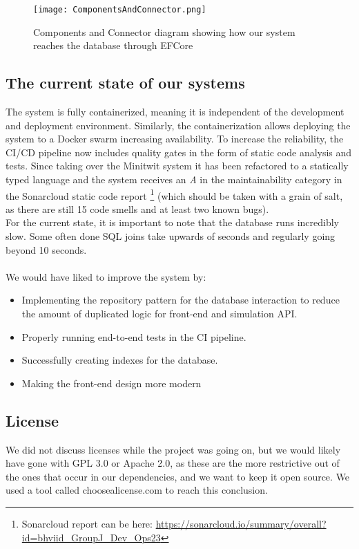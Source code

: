 \begin{figure}[h]
    \centering
    \texttt{[image: ComponentsAndConnector.png]}
    \caption{Components and Connector diagram showing how our system reaches the database through EFCore}
    \label{fig:componentsAndConnector}
\end{figure}
\newpage

\subsection{The current state of our systems}
The system is fully containerized, meaning it is independent of the development and deployment environment. Similarly, the containerization allows deploying the system to a Docker swarm increasing availability.
To increase the reliability, the CI/CD pipeline now includes quality gates in the form of static code analysis and tests.
Since taking over the Minitwit system it has been refactored to a statically typed language and the system receives an \textit{A} in the maintainability category in the Sonarcloud static code report 
\footnote{ Sonarcloud report can be here: 
 \url{https://sonarcloud.io/summary/overall?id=bhviid_GroupJ_Dev_Ops23} } 
(which should be taken with a grain of salt, as there are still 15 code smells and at least two known bugs).
\\
For the current state, it is important to note that the database runs incredibly slow. Some often done SQL joins take upwards of seconds and regularly going beyond 10 seconds.
\\
\\
We would have liked to improve the system by:
\begin{itemize}
    \item Implementing the repository pattern for the database interaction to reduce the amount of duplicated logic for front-end and simulation API.
    \item Properly running end-to-end tests in the CI pipeline.
    \item Successfully creating indexes for the database.
    \item Making the front-end design more modern
    
\end{itemize}

\subsection{License}
We did not discuss licenses while the project was going on, but we would likely have gone with GPL 3.0 or Apache 2.0, as these are the more restrictive out of the ones that occur in our dependencies, and we want to keep it open source. We used a tool called choosealicense.com to reach this conclusion.
